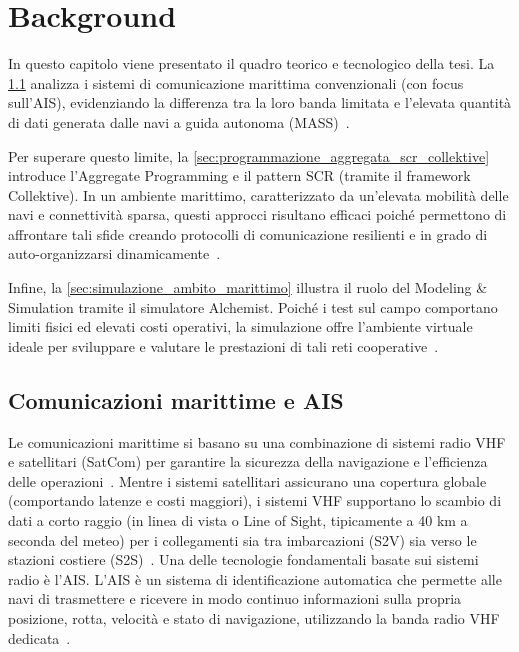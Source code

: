 \chapter{Background}
\label{chap:background}

In questo capitolo viene presentato il quadro teorico e tecnologico della tesi. La \cref{sec:comunicazioni_marittime_e_ais} analizza i sistemi di comunicazione marittima convenzionali (con focus sull'\ac{AIS}), evidenziando la differenza tra la loro banda limitata e l'elevata quantità di dati generata dalle navi a guida autonoma (\ac{MASS})~\cite{11217861, roadmap}.

Per superare questo limite, la \cref{sec:programmazione_aggregata_scr_collektive} introduce l'Aggregate Programming e il pattern \ac{SCR} (tramite il framework Collektive). In un ambiente marittimo, caratterizzato da un'elevata mobilità delle navi e connettività sparsa, questi approcci risultano efficaci poiché permettono di affrontare tali sfide creando protocolli di comunicazione resilienti e in grado di auto-organizzarsi dinamicamente~\cite{beal2015aggregate, casadei2019self, 11217861}.

Infine, la \cref{sec:simulazione_ambito_marittimo} illustra il ruolo del Modeling \& Simulation tramite il simulatore Alchemist. Poiché i test sul campo comportano limiti fisici ed elevati costi operativi, la simulazione offre l'ambiente virtuale ideale per sviluppare e valutare le prestazioni di tali reti cooperative~\cite{11217861, pianini_2013}.

\section{Comunicazioni marittime e AIS}
\label{sec:comunicazioni_marittime_e_ais}

Le comunicazioni marittime si basano su una combinazione di sistemi radio \ac{VHF} e satellitari (\ac{SatCom}) per garantire la sicurezza della navigazione e l'efficienza delle operazioni~\cite{11217861}. Mentre i sistemi satellitari assicurano una copertura globale (comportando latenze e costi maggiori), i sistemi \ac{VHF} supportano lo scambio di dati a corto raggio (in linea di vista o Line of Sight, tipicamente a 40 km a seconda del meteo) per i collegamenti sia tra imbarcazioni (\ac{S2V}) sia verso le stazioni costiere (\ac{S2S})~\cite{11217861}. Una delle tecnologie fondamentali basate sui sistemi radio è l'\ac{AIS}. L'\ac{AIS} è un sistema di identificazione automatica che permette alle navi di trasmettere e ricevere in modo continuo informazioni sulla propria posizione, rotta, velocità e stato di navigazione, utilizzando la banda radio \ac{VHF} dedicata~\cite{itu_m1371_6}.

